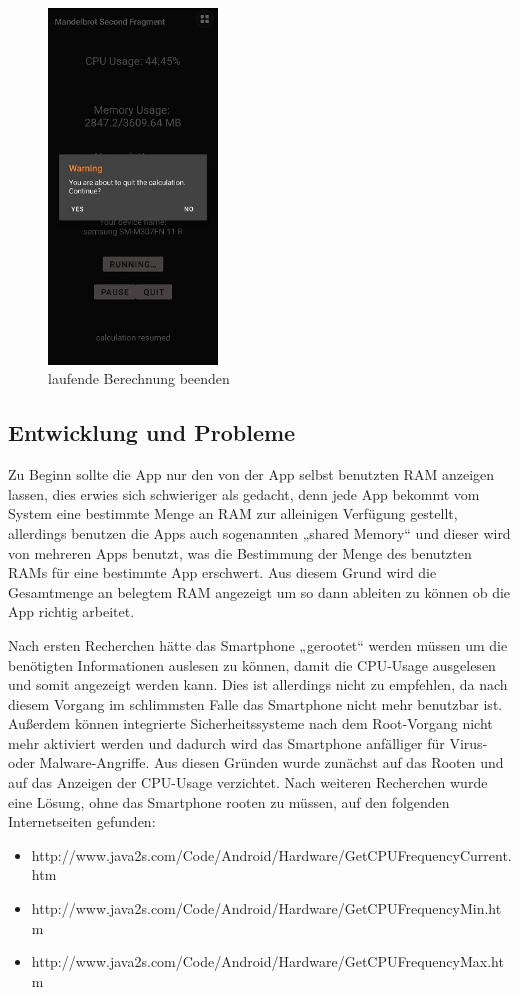 \documentclass[12pt, onecolumn, notitlepage]{scrartcl}
\begin{document}
\begin{figure}[H] 
	\centering
	\includegraphics[height=0.5\textheight,width=0.4\textwidth]{calc_quit.jpg}
	\caption{laufende Berechnung beenden}
\end{figure}


\subsection{Entwicklung und Probleme}
Zu Beginn sollte die App nur den von der App selbst benutzten RAM anzeigen lassen, dies erwies sich schwieriger als gedacht, denn jede App bekommt vom System eine bestimmte Menge an RAM zur alleinigen Verfügung gestellt, allerdings benutzen die Apps auch sogenannten „shared Memory“ und dieser wird von mehreren Apps benutzt, was die Bestimmung der Menge des benutzten RAMs für eine bestimmte App erschwert. Aus diesem Grund wird die Gesamtmenge an belegtem RAM angezeigt um so dann ableiten zu können ob die App richtig arbeitet. \par
Nach ersten Recherchen hätte das Smartphone „gerootet“ werden müssen um die benötigten Informationen auslesen zu können, damit die CPU-Usage ausgelesen und somit angezeigt werden kann. Dies ist allerdings nicht zu empfehlen, da nach diesem Vorgang im schlimmsten Falle das Smartphone nicht mehr benutzbar ist. Außerdem können integrierte Sicherheitssysteme nach dem Root-Vorgang nicht mehr aktiviert werden und dadurch wird das Smartphone anfälliger für Virus- oder Malware-Angriffe. Aus diesen Gründen wurde zunächst auf das Rooten und auf das Anzeigen der CPU-Usage verzichtet. Nach weiteren Recherchen wurde eine Lösung, ohne das Smartphone rooten zu müssen, auf den folgenden Internetseiten gefunden:
\begin{itemize}
	\itemsep0pt
	\item http://www.java2s.com/Code/Android/Hardware/GetCPUFrequencyCurrent.htm
	\item http://www.java2s.com/Code/Android/Hardware/GetCPUFrequencyMin.htm
	\item http://www.java2s.com/Code/Android/Hardware/GetCPUFrequencyMax.htm 
\end{itemize}
\end{document}

